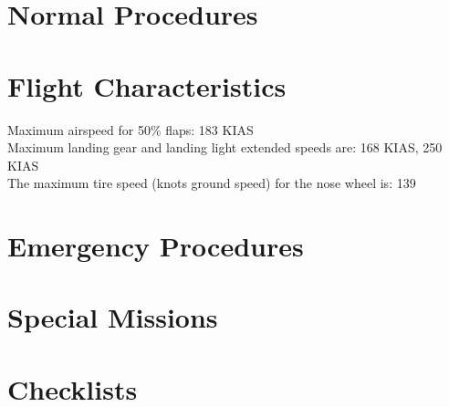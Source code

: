 \part{Normal Procedures}
\part{Flight Characteristics}

Maximum airspeed for 50\% flaps: 183 KIAS\\
Maximum landing gear and landing light extended speeds are: 168 KIAS, 250 KIAS\\
The maximum tire speed (knots ground speed) for the nose wheel is: 139\\


\part{Emergency Procedures}
\part{Special Missions}
\part{Checklists}
